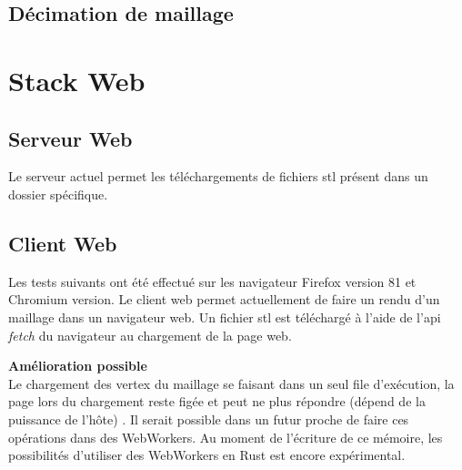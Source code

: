 \subsection{Décimation de maillage}

\section{Stack Web}
\subsection{Serveur Web}

Le serveur actuel permet les téléchargements de fichiers \gls{stl} présent dans
un dossier spécifique. 

\subsection{Client Web}
Les tests suivants ont été effectué sur les navigateur Firefox version 81 et
Chromium version.
Le client web permet actuellement de faire un rendu d'un maillage dans un
navigateur web. Un fichier \gls{stl} est téléchargé à l'aide de l'api
\textit{fetch} du navigateur au chargement de la page web.

\textbf{Amélioration possible} \\
Le chargement des vertex du maillage se faisant dans un seul file d'exécution,
la page lors du chargement reste figée et peut ne plus répondre (dépend de la
puissance de l'hôte) .
Il serait possible dans un futur proche de faire ces opérations dans des WebWorkers. Au
moment de l'écriture de ce mémoire, les possibilités d'utiliser des WebWorkers
en Rust est encore expérimental.
